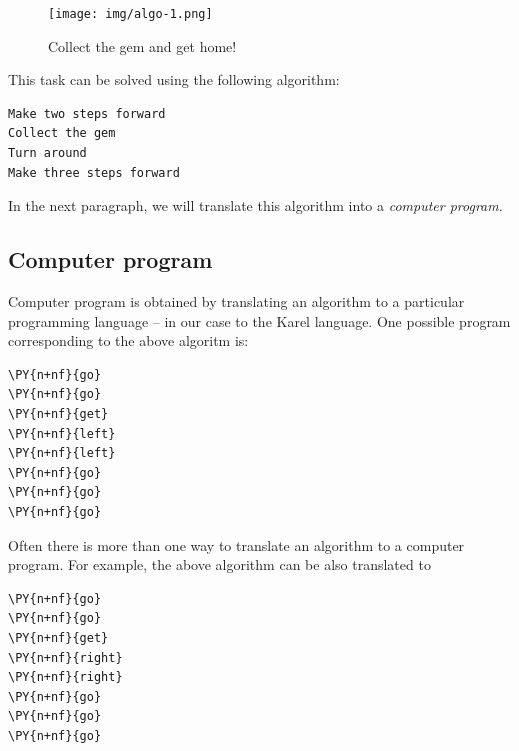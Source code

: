 \newpage

\begin{figure}[!ht]
\begin{center}
\texttt{[image: img/algo-1.png]}
\vspace{-0mm}
\caption{Collect the gem and get home!}
\label{fig:algo-1}
\end{center}
\end{figure}

\noindent
This task can be solved using the following algorithm:

\begin{verbatim}
Make two steps forward
Collect the gem
Turn around
Make three steps forward
\end{verbatim}
In the next paragraph, we will translate this algorithm into a {\em computer program}.

\subsection{Computer program}

Computer program is obtained by translating an algorithm 
to a particular programming language -- in our case to the Karel language. 
One possible program corresponding to the above algoritm is:\\

\begin{bbox}
\begin{Verbatim}[commandchars=\\\{\}]
\PY{n+nf}{go}
\PY{n+nf}{go}
\PY{n+nf}{get}
\PY{n+nf}{left}
\PY{n+nf}{left}
\PY{n+nf}{go}
\PY{n+nf}{go}
\PY{n+nf}{go}
\end{Verbatim}
\end{bbox}
\vspace{6mm}

\noindent
Often there is more than one way to translate an algorithm to a computer 
program. For example, the above algorithm can be also translated to\\

\begin{bbox}
\begin{Verbatim}[commandchars=\\\{\}]
\PY{n+nf}{go}
\PY{n+nf}{go}
\PY{n+nf}{get}
\PY{n+nf}{right}
\PY{n+nf}{right}
\PY{n+nf}{go}
\PY{n+nf}{go}
\PY{n+nf}{go}
\end{Verbatim}
\end{bbox}
\vspace{6mm}

